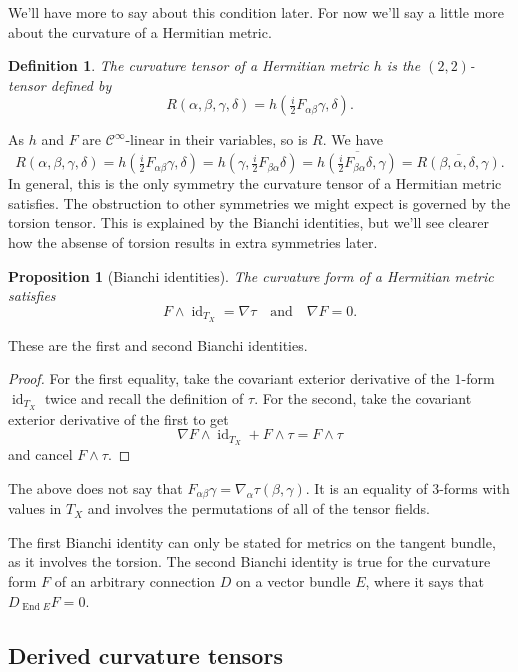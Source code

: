 \documentclass[10pt,a4paper]{article}
\newtheorem{prop}[theo]{Proposition}
\newtheorem{defi}[theo]{Definition}
\newtheorem*{proof}{Proof}
\newcommand{\cc}[1]{\mathcal{#1}}
\DeclareMathOperator{\End}{End}
\DeclareMathOperator{\id}{id}
\begin{document}
We'll have more to say about this condition later. For now we'll say a little more about the curvature of a Hermitian metric.


\begin{defi}
The \emph{curvature tensor} of a Hermitian metric $h$ is the $(2,2)$-tensor defined by
$$
R(\alpha,\beta,\gamma,\delta)
= h(\tfrac i2 F_{\alpha\beta}\gamma, \delta).
$$
\end{defi}

As $h$ and $F$ are $\cc C^\infty$-linear in their variables, so is $R$. We have
$$
R(\alpha,\beta,\gamma,\delta)
= h(\tfrac i2 F_{\alpha\beta}\gamma, \delta)
= h(\gamma, \tfrac i2 F_{\beta\alpha}\delta)
= \overline{h(\tfrac i2 F_{\beta\alpha}\delta, \gamma)}
= \overline{R(\beta,\alpha,\delta,\gamma)}.
$$
In general, this is the only symmetry the curvature tensor of a Hermitian metric satisfies. The obstruction to other symmetries we might expect is governed by the torsion tensor. This is explained by the Bianchi identities, but we'll see clearer how the absense of torsion results in extra symmetries later.


\begin{prop}[Bianchi identities]
The curvature form of a Hermitian metric satisfies
$$
F \wedge \id_{T_X} = \nabla \tau
\quad\text{and}\quad
\nabla F = 0.
$$
\end{prop}

These are the first and second Bianchi identities.

\begin{proof}
  For the first equality, take the covariant exterior derivative of the $1$-form $\id_{T_X}$ twice and recall the definition of $\tau$. For the second, take the covariant exterior derivative of the first to get
$$
\nabla F \wedge \id_{T_X} + F \wedge \tau = F \wedge \tau
$$
and cancel $F \wedge \tau$.
\end{proof}


The above does not say that $F_{\alpha\beta}\gamma = \nabla_\alpha \tau(\beta,\gamma)$. It is an equality of $3$-forms with values in $T_X$ and involves the permutations of all of the tensor fields.

The first Bianchi identity can only be stated for metrics on the tangent bundle, as it involves the torsion. The second Bianchi identity is true for the curvature form $F$ of an arbitrary connection $D$ on a vector bundle $E$, where it says that $D_{\End E} F = 0$.


\subsection{Derived curvature tensors}
\end{document}

